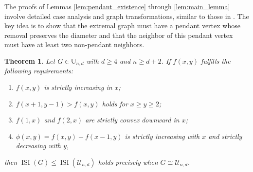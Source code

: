 \documentclass[12pt]{article}
\newtheorem{theorem}{Theorem}[section]
\theoremstyle{definition}
\newcommand{\ISI}{\operatorname{ISI}}
\newcommand{\UU}{\mathbb{U}}
\begin{document}
The proofs of Lemmas \ref{lem:pendant_existence} through \ref{lem:main_lemma} involve detailed case analysis and graph transformations, similar to those in \cite{zhang2025abs, gao2025extremal}. The key idea is to show that the extremal graph must have a pendant vertex whose removal preserves the diameter and that the neighbor of this pendant vertex must have at least two non-pendant neighbors.

\begin{theorem}
\label{thm:unicyclic_d4_general}
Let \(G \in \UU_{n,d}\) with \(d \geq 4\) and \(n \geq d+2\). If \(f(x,y)\) fulfills the following requirements:
\begin{enumerate}[label=(\roman*)]
\item \(f(x,y)\) is strictly increasing in \(x\);
\item \(f(x+1,y-1) > f(x,y)\) holds for \(x \geq y \geq 2\);
\item \(f(1,x)\) and \(f(2,x)\) are strictly convex downward in \(x\);
\item \(\phi(x,y) = f(x,y) - f(x-1,y)\) is strictly increasing with \(x\) and strictly decreasing with \(y\),
\end{enumerate}
then \(\ISI(G) \leq \ISI(\mathcal{U}_{n,d})\) holds precisely when \(G \cong \mathcal{U}_{n,d}\).
\end{theorem}
\end{document}
